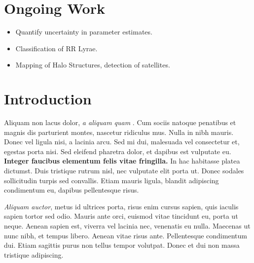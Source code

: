 \documentclass[a0,portrait]{a0poster}
\begin{document}
\begin{multicols}{2}
\begin{itemize}
\end{itemize}

\section*{Ongoing Work}

\begin{itemize}
\item Quantify uncertainty in parameter estimates.
\item Classification of RR Lyrae.
\item Mapping of Halo Structures, detection of satellites.
\end{itemize}





\color{SaddleBrown} %

\section*{Introduction}

Aliquam non lacus dolor, \textit{a aliquam quam} \cite{Smith:2012qr}. Cum sociis natoque penatibus et magnis dis parturient montes, nascetur ridiculus mus. Nulla in nibh mauris. Donec vel ligula nisi, a lacinia arcu. Sed mi dui, malesuada vel consectetur et, egestas porta nisi. Sed eleifend pharetra dolor, et dapibus est vulputate eu. \textbf{Integer faucibus elementum felis vitae fringilla.} In hac habitasse platea dictumst. Duis tristique rutrum nisl, nec vulputate elit porta ut. Donec sodales sollicitudin turpis sed convallis. Etiam mauris ligula, blandit adipiscing condimentum eu, dapibus pellentesque risus.

\textit{Aliquam auctor}, metus id ultrices porta, risus enim cursus sapien, quis iaculis sapien tortor sed odio. Mauris ante orci, euismod vitae tincidunt eu, porta ut neque. Aenean sapien est, viverra vel lacinia nec, venenatis eu nulla. Maecenas ut nunc nibh, et tempus libero. Aenean vitae risus ante. Pellentesque condimentum dui. Etiam sagittis purus non tellus tempor volutpat. Donec et dui non massa tristique adipiscing.



\end{multicols}
\end{document}

